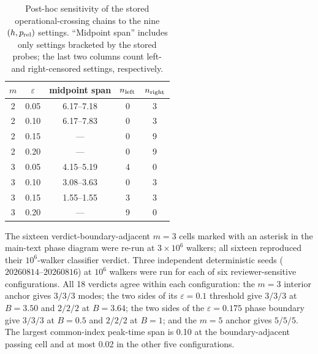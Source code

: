 \documentclass[aps,physrev,onecolumn,amsmath,amssymb,longbibliography]{revtex4-2}
\begin{document}
\begin{table}[t]
\caption{Post-hoc sensitivity of the stored operational-crossing chains to
the nine \((h,p_{\rm rel})\) settings.  ``Midpoint span'' includes only
settings bracketed by the stored probes; the last two columns count
left- and right-censored settings, respectively.
\label{tab:supp-bop-sensitivity}}
\begin{ruledtabular}
\begin{tabular}{ccccc}
\(m\) & \(\varepsilon\) & midpoint span & \(n_{\rm left}\) & \(n_{\rm right}\)\\
\hline
2 & 0.05 & 6.17--7.18 & 0 & 3\\
2 & 0.10 & 6.17--7.83 & 0 & 3\\
2 & 0.15 & --- & 0 & 9\\
2 & 0.20 & --- & 0 & 9\\
3 & 0.05 & 4.15--5.19 & 4 & 0\\
3 & 0.10 & 3.08--3.63 & 0 & 3\\
3 & 0.15 & 1.55--1.55 & 3 & 3\\
3 & 0.20 & --- & 9 & 0\\
\end{tabular}
\end{ruledtabular}
\end{table}

The sixteen verdict-boundary-adjacent \(m=3\) cells marked with an asterisk
in the main-text phase diagram were re-run at \(3\times10^{6}\) walkers; all
sixteen reproduced their \(10^{6}\)-walker classifier verdict.
Three independent deterministic seeds (\(20260814\)--\(20260816\)) at
\(10^6\) walkers were run for each
of six reviewer-sensitive configurations.  All 18 verdicts agree within each
configuration: the \(m=3\) interior anchor gives \(3/3/3\) modes; the two sides
of its \(\varepsilon=0.1\) threshold give \(3/3/3\) at \(B=3.50\) and
\(2/2/2\) at \(B=3.64\); the two sides of the \(\varepsilon=0.175\) phase
boundary give \(3/3/3\) at \(B=0.5\) and \(2/2/2\) at \(B=1\); and the
\(m=5\) anchor gives \(5/5/5\).  The largest common-index peak-time span is
0.10 at the boundary-adjacent passing cell and at most 0.02 in the other five
configurations.
\end{document}
